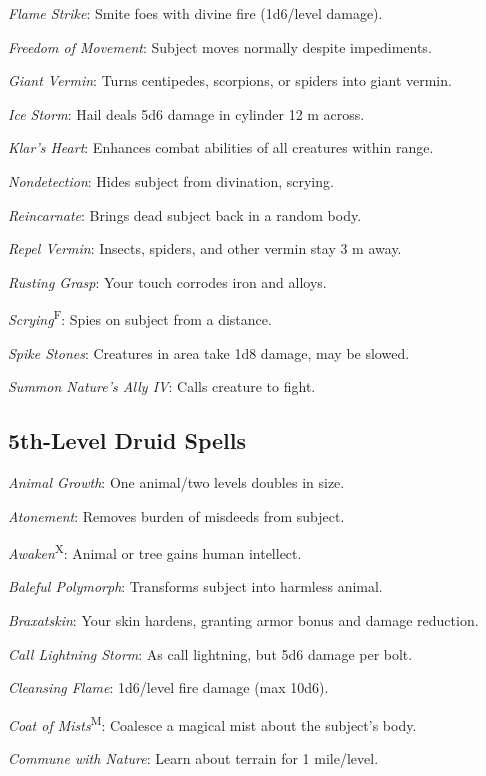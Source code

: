 \textit{Flame Strike}: Smite foes with divine fire (1d6/level damage).

\textit{Freedom of Movement}: Subject moves normally despite impediments.

\textit{Giant Vermin}: Turns centipedes, scorpions, or spiders into giant vermin.

\textit{Ice Storm}: Hail deals 5d6 damage in cylinder 12 m across.

\textit{Klar's Heart}: Enhances combat abilities of all creatures within range.

\textit{Nondetection}: Hides subject from divination, scrying.

\textit{Reincarnate}: Brings dead subject back in a random body.

\textit{Repel Vermin}: Insects, spiders, and other vermin stay 3 m away.

\textit{Rusting Grasp}: Your touch corrodes iron and alloys.

\textit{Scrying}\textsuperscript{F}: Spies on subject from a distance.

\textit{Spike Stones}: Creatures in area take 1d8 damage, may be slowed.

\textit{Summon Nature's Ally IV}: Calls creature to fight.



\subsection{5th-Level Druid Spells}

\textit{Animal Growth}: One animal/two levels doubles in size.

\textit{Atonement}: Removes burden of misdeeds from subject.

\textit{Awaken}\textsuperscript{X}: Animal or tree gains human intellect.

\textit{Baleful Polymorph}: Transforms subject into harmless animal.

\textit{Braxatskin}: Your skin hardens, granting armor bonus and damage reduction.

\textit{Call Lightning Storm}: As call lightning, but 5d6 damage per bolt.

\textit{Cleansing Flame}: 1d6/level fire damage (max 10d6).

\textit{Coat of Mists}\textsuperscript{M}: Coalesce a magical mist about the subject’s body.

\textit{Commune with Nature}: Learn about terrain for 1 mile/level.

